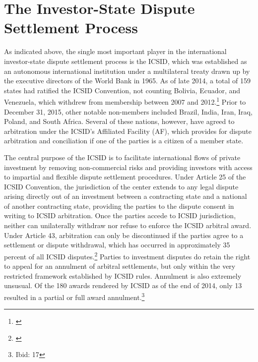\documentclass[12pt,onesided]{amsart}
\begin{document}
\section*{The Investor-State Dispute Settlement Process}

As indicated above, the single most important player in the international investor-state dispute settlement process is the ICSID, which was established as an autonomous international institution under a multilateral treaty drawn up by the executive directors of the World Bank in 1965. As of late 2014, a total of 159 states had ratified the ICSID Convention, not counting Bolivia, Ecuador, and Venezuela, which withdrew from membership between 2007 and 2012.\footnote{\citet{icsid:2014b}}  Prior to December 31, 2015, other notable non-members included Brazil, India, Iran, Iraq, Poland, and South Africa. Several of these nations, however, have agreed to arbitration under the ICSID's Affiliated Facility (AF), which provides for dispute arbitration and conciliation if one of the parties is a citizen of a member state. 

The central purpose of the ICSID is to facilitate international flows of private investment by removing non-commercial risks and providing investors with access to impartial and flexible dispute settlement procedures. Under Article 25 of the ICSID Convention, the jurisdiction of the center extends to any legal dispute arising directly out of an investment between a contracting state and a national of another contracting state, providing the parties to the dispute consent in writing to ICSID arbitration. Once the parties accede to ICSID jurisdiction, neither can unilaterally withdraw nor refuse to enforce the ICSID arbitral award. Under Article 43, arbitration can only be discontinued if the parties agree to a settlement or dispute withdrawal, which has occurred in approximately 35 percent of all ICSID disputes.\footnote{\citet[p. 17]{icsid:2015}} Parties to investment disputes do retain the right to appeal for an annulment of arbitral settlements, but only within the very restricted framework established by ICSID rules. Annulment is also extremely unsusual. Of the 180 awards rendered by ICSID as of the end of 2014, only 13 resulted in a partial or full award annulment.\footnote{Ibid: 17}
\end{document}
